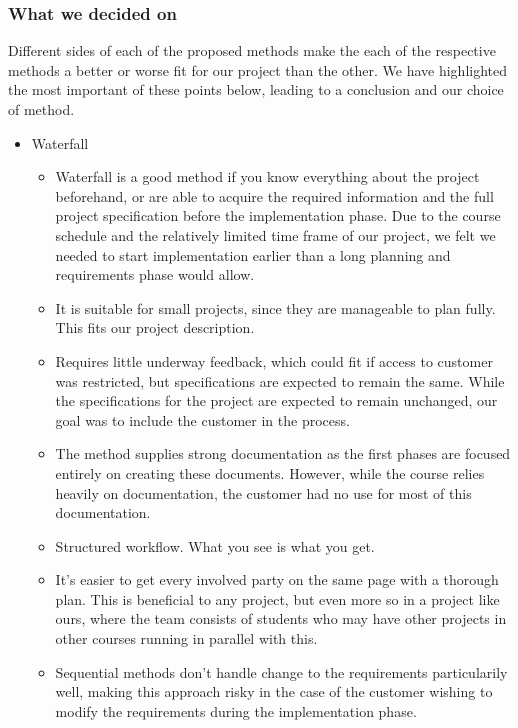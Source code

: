\subsubsection{What we decided on}
Different sides of each of the proposed methods make the each of the respective methods a better or worse fit for our project than the other. We have highlighted the most important of these points below, leading to a conclusion and our choice of method.
\begin{itemize}
	\item Waterfall
	\begin{itemize}
		\item Waterfall is a good method if you know everything about the project beforehand, or are able to acquire the required information and the full project specification before the implementation phase. Due to the course schedule and the relatively limited time frame of our project, we felt we needed to start implementation earlier than a long planning and requirements phase would allow.
		\item It is suitable for small projects, since they are manageable to plan fully. This fits our project description.
		\item Requires little underway feedback, which could fit if access to customer was restricted, but specifications are expected to remain the same. While the specifications for the project are expected to remain unchanged, our goal was to include the customer in the process.
		\item The method supplies strong documentation as the first phases are focused entirely on creating these documents. However, while the course relies heavily on documentation, the customer had no use for most of this documentation.
		\item Structured workflow. What you see is what you get. %
		\item It's easier to get every involved party on the same page with a thorough plan. This is beneficial to any project, but even more so in a project like ours, where the team consists of students who may have other projects in other courses running in parallel with this.
		\item Sequential methods don't handle change to the requirements particularily well, making this approach risky in the case of the customer wishing to modify the requirements during the implementation phase.
	\end{itemize}
\end{itemize}
